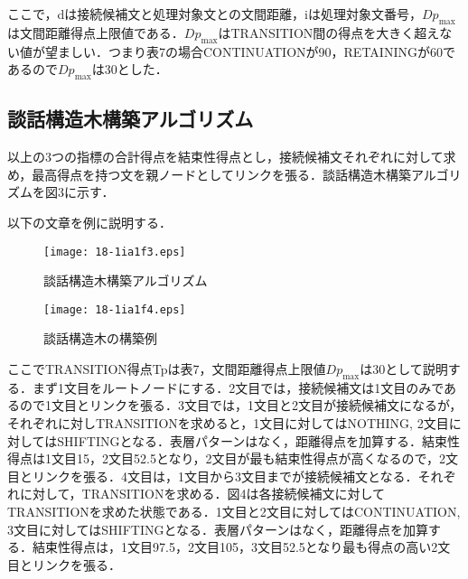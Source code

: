 \documentclass[japanese]{jnlp_1.4}
\begin{document}
ここで，dは接続候補文と処理対象文との文間距離，iは処理対象文番号，$Dp_{\max}$は文間距離得点上限値である．$Dp_{\max}$はTRANSITION間の得点を大きく超えない値が望ましい．つまり表7の場合CONTINUATIONが90，RETAININGが60であるので$Dp_{\max}$は30とした．


\subsection{談話構造木構築アルゴリズム}
\label{sec:mylabel13}

以上の3つの指標の合計得点を結束性得点とし，接続候補文それぞれに対して求め，最高得点を持つ文を親ノードとしてリンクを張る．談話構造木構築アルゴリズムを図3に示す．



以下の文章を例に説明する．

\vspace{1\baselineskip}
\vspace{1\baselineskip}

\begin{figure}[t]
\begin{center}
\texttt{[image: 18-1ia1f3.eps]}
\end{center}
\caption{談話構造木構築アルゴリズム}
\vspace{2\baselineskip}
\end{figure}
\begin{figure}[t]
\begin{center}
\texttt{[image: 18-1ia1f4.eps]}
\end{center}
\caption{談話構造木の構築例}
\vspace{-1\baselineskip}
\end{figure}


ここでTRANSITION得点Tpは表7，文間距離得点上限値$Dp_{\max}$は30として説明する．まず1文目をルートノードにする．2文目では，接続候補文は1文目のみであるので1文目とリンクを張る．3文目では，1文目と2文目が接続候補文になるが，それぞれに対しTRANSITIONを求めると，1文目に対してはNOTHING, 2文目に対してはSHIFTINGとなる．表層パターンはなく，距離得点を加算する．結束性得点は1文目15，2文目52.5となり，2文目が最も結束性得点が高くなるので，2文目とリンクを張る．4文目は，1文目から3文目までが接続候補文となる．それぞれに対して，TRANSITIONを求める．図4は各接続候補文に対してTRANSITIONを求めた状態である．1文目と2文目に対してはCONTINUATION, 3文目に対してはSHIFTINGとなる．表層パターンはなく，距離得点を加算する．結束性得点は，1文目97.5，2文目105，3文目52.5となり最も得点の高い2文目とリンクを張る．
\end{document}
